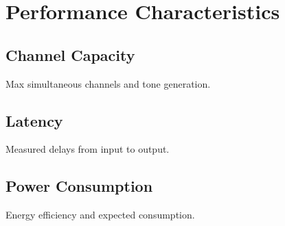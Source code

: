 \section{Performance Characteristics}
\subsection{Channel Capacity}
Max simultaneous channels and tone generation.
\subsection{Latency}
Measured delays from input to output.
\subsection{Power Consumption}
Energy efficiency and expected consumption.